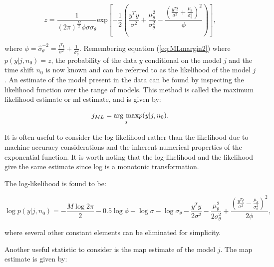\begin{equation}\label{eq:MLprod7}
z = \frac{1}{\left(2 \pi\right)^{\frac{M}{2}}\phi \sigma \sigma_\theta}\textrm{exp}\left[-\frac{1}{2}\left(\frac{y^T y}{\sigma^2}+\frac{\mu_\theta^2}{\sigma_\theta^2} - \frac{\left(\frac{y^T t}{\sigma^2}+\frac{\mu_\theta}{\sigma_\theta^2}\right)^2}{\phi}\right)\right],
\end{equation}

where $\phi = \hat{\sigma}^{-2}_\theta = \frac{t^Tt}{\sigma^2} + \frac{1}{\sigma_\theta^2}$. Remembering equation (\ref{eq:MLmargin2}) \linebreak[0]where \linebreak[0]$p(y|j,n_0) = z$, the probability of the data $y$ conditional on the model $j$ and the time shift $n_0$ is now known and can be referred to as the likelihood of the model $j$. An estimate of the model present in the data can be found by inspecting the likelihood function over the range of models. This method is called the maximum likelihood estimate or \DIFdelbegin {}\DIFdelend \DIFaddbegin \gls{ml} \DIFaddend estimate, and is given by:

\begin{equation}\label{eq:MLdefinition}
j_{ML} = \underset{j}{\mathrm{arg~max}} p(y|j,n_0).
\end{equation}

It is often useful to consider the log-likelihood rather than the likelihood due to machine accuracy considerations and the inherent \DIFdelbegin {}\DIFdelend numerical properties of the exponential function. It is worth noting that the log-likelihood and the likelihood give the same estimate since log is a monotonic transformation.

The log-likelihood is found to be:

\begin{equation}\label{eq:MLloglikelihood}
\log{p(y|j,n_0)} = -\frac{M\log{2\pi}}{2} - 0.5\log{\phi} - \log{\sigma} -\log{\sigma_\theta} - \frac{y^T y}{2\sigma^2} -\frac{\mu^2_\theta}{2\sigma^2_\theta} + \frac{\left(\frac{y^T t}{\sigma^2}-\frac{\mu_\theta}{\sigma^2_\theta}\right)^2}{2\phi},
\end{equation}

where several other constant elements can be eliminated for simplicity.

Another useful statistic to consider is the \DIFdelbegin {}\emph{} %
\DIFdelend \DIFaddbegin \gls{map} \DIFaddend estimate of the model $j$. The \DIFdelbegin {}\DIFdelend \DIFaddbegin \gls{map} \DIFaddend estimate is given by:

